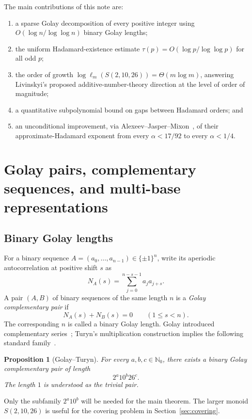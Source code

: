 \documentclass[11pt]{article}
\newtheorem{proposition}[theorem]{Proposition}
\newcommand{\N}{\mathbb{N}}
\begin{document}
The main contributions of this note are:
\begin{enumerate}[leftmargin=2em]
\item a sparse Golay decomposition of every positive integer using $O(\log n/\log\log n)$ binary Golay lengths;
\item the uniform Hadamard-existence estimate $\tau(p)=O(\log p/\log\log p)$ for all odd $p$;
\item the order of growth $\log \ell_m(S(2,10,26))=\Theta(m\log m)$, answering Livinskyi's proposed additive-number-theory direction at the level of order of magnitude;
\item a quantitative subpolynomial bound on gaps between Hadamard orders; and
\item an unconditional improvement, via Alexeev--Jasper--Mixon~\cite{Alexeev2025}, of their approximate-Hadamard exponent from every $\alpha<17/92$ to every $\alpha<1/4$.
\end{enumerate}

\section{Golay pairs, complementary sequences, and multi-base representations}

\subsection{Binary Golay lengths}
For a binary sequence $A=(a_0,\ldots,a_{n-1})\in\{\pm1\}^n$, write its aperiodic autocorrelation at positive shift $s$ as
\[
N_A(s)=\sum_{j=0}^{n-s-1}a_j a_{j+s}.
\]
A pair $(A,B)$ of binary sequences of the same length $n$ is a \emph{Golay complementary pair} if
\[
N_A(s)+N_B(s)=0\qquad(1\le s<n).
\]
The corresponding $n$ is called a binary Golay length.  Golay introduced complementary series~\cite{Golay1961}; Turyn's multiplication construction implies the following standard family~\cite{Turyn1974}.

\begin{proposition}[Golay--Turyn]\label{prop:golaylengths}
For every $a,b,c\in\N_0$, there exists a binary Golay complementary pair of length
\[
2^a10^b26^c.
\]
The length $1$ is understood as the trivial pair.
\end{proposition}

Only the subfamily $2^a10^b$ will be needed for the main theorem.  The larger monoid $S(2,10,26)$ is useful for the covering problem in Section~\ref{sec:covering}.
\end{document}
